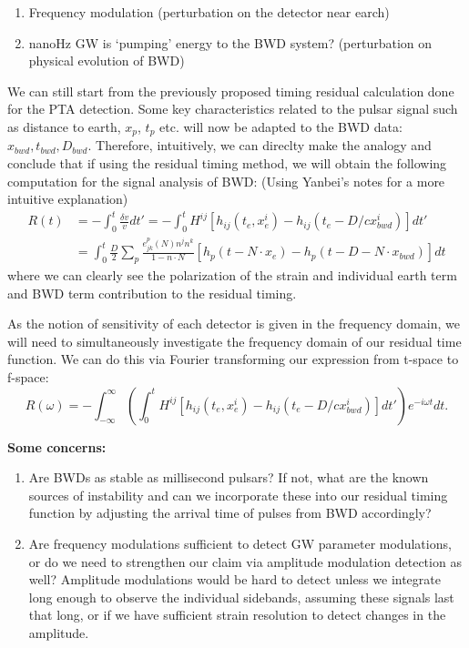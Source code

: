 \documentclass{article}
\begin{document}
\begin{enumerate}
    \item Frequency modulation (perturbation on the detector near earch)
    \item nanoHz GW is ‘pumping’ energy to the BWD system? (perturbation on physical evolution of BWD)
\end{enumerate}


We can still start from the previously proposed timing residual calculation done for the PTA detection. Some key characteristics related to the pulsar signal such as distance to earth, $x_p$, $t_p$ etc. will now be adapted to the BWD data: $x_{bwd},t_{bwd},D_{bwd}$. Therefore, intuitively, we can direclty make the analogy and conclude that if using the residual timing method, we will obtain the following computation for the signal analysis of BWD: (Using Yanbei's notes for a more intuitive explanation)
\begin{align}
    R(t)&=-\int_0^t\frac{\delta v}{v}dt'=-\int_0^t H^{ij}\left[h_{ij}(t_e,x_e^i)-h_{ij}(t_e-D/cx_{bwd}^i)\right]dt'\\
    &=\int_0^t\frac{D}{2}\sum_p\frac{e^p_{jk}(N)n^jn^k}{1-n\cdot N}\left[h_p(t-N\cdot{x_e})-h_p(t-D-N\cdot{x_{bwd}})\right]dt
\end{align}
where we can clearly see the polarization of the strain and individual earth term and BWD term contribution to the residual timing.

As the notion of sensitivity of each detector is given in the frequency domain, we will need to simultaneously investigate the frequency domain of our residual time function. We can do this via Fourier transforming our expression from t-space to f-space:
\begin{equation}
    R(\omega)=-\int_{-\infty}^{\infty}\left(\int_0^tH^{ij}\left[h_{ij}(t_e,x_e^i)-h_{ij}(t_e-D/cx_{bwd}^i)\right]dt'\right)e^{-i\omega t}dt.
\end{equation}

\textbf{Some concerns:}
\begin{enumerate}
    \item Are BWDs as stable as millisecond pulsars? If not, what are the known sources of instability and can we incorporate these into our residual timing function by adjusting the arrival time of pulses from BWD accordingly?
    \item Are frequency modulations sufficient to detect GW parameter modulations, or do we need to strengthen our claim via amplitude modulation detection as well? 
    Amplitude modulations would be hard to detect unless we integrate long enough to observe the individual sidebands, assuming these signals last that long, or if we have sufficient strain resolution to detect changes in the amplitude.
\end{enumerate}
\end{document}
